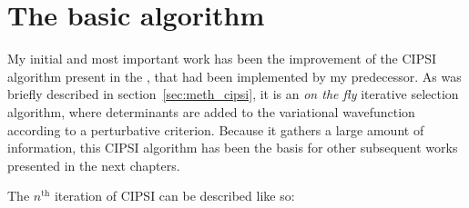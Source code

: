 \documentclass[./thesis.tex]{subfiles}
\begin{document}
\label{chap:CIPSI}


\section{The basic algorithm}
My initial and most important work has been the improvement of the CIPSI algorithm present in the \QP, that had been implemented by my predecessor.\cite{giner:tel-01077016} As was briefly described in section~\ref{sec:meth_cipsi}, it is an \emph{on the fly} iterative selection algorithm, where determinants are added to the variational wavefunction according to a perturbative criterion. Because it gathers a large amount of information, this CIPSI algorithm has been the basis for other subsequent works presented in the next chapters.

The $n^\text{th}$ iteration of CIPSI can be described like so:
\end{document}
